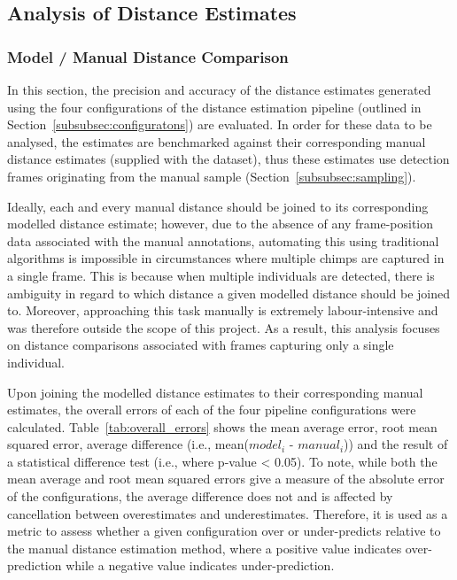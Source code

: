 \subsection{Analysis of Distance Estimates}

\subsubsection{Model / Manual Distance Comparison}\label{subsubsec:distance_comparison}

In this section, the precision and accuracy of the distance estimates generated using the
four configurations of the distance estimation pipeline (outlined in
Section~\ref{subsubsec:configuratons}) are evaluated.
In order for these data to be analysed, the estimates are benchmarked against their
corresponding manual distance estimates (supplied with the dataset), thus these estimates
use detection frames originating from the manual sample (Section~\ref{subsubsec:sampling}).

Ideally, each and every manual distance should be joined to its corresponding modelled
distance estimate; however, due to the absence of any frame-position data associated
with the manual annotations, automating this using traditional algorithms is impossible
in circumstances where multiple chimps are captured in a single frame.
This is because when multiple individuals are detected, there is ambiguity in regard to
which distance a given modelled distance should be joined to.
Moreover, approaching this task manually is extremely labour-intensive and was therefore
outside the scope of this project.
As a result, this analysis focuses on distance comparisons associated with frames capturing
only a single individual.

Upon joining the modelled distance estimates to their corresponding manual estimates, the
overall errors of each of the four pipeline configurations were calculated.
Table~\ref{tab:overall_errors} shows the mean average error, root mean squared error,
average difference (i.e., mean($model_i$ - $manual_i$)) and the result of a statistical
difference test (i.e., where p-value < 0.05).
To note, while both the mean average and root mean squared errors give a measure of the
absolute error of the configurations, the average difference does not and is affected by
cancellation between overestimates and underestimates.
Therefore, it is used as a metric to assess whether a given configuration over or
under-predicts relative to the manual distance estimation method, where a positive value
indicates over-prediction while a negative value indicates under-prediction.


